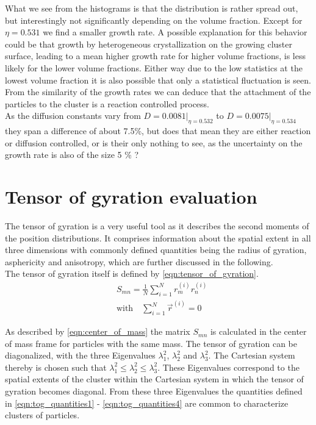 What we see from the histograms is that the distribution is rather spread out, but interestingly not significantly depending on the volume fraction. Except for $\eta = 0.531$ we find a smaller growth rate. A possible explanation for this behavior could be that growth by heterogeneous crystallization on the growing cluster surface, leading to a mean higher growth rate for higher volume fractions, is less likely for the lower volume fractions. Either way due to the low statistics at the lowest volume fraction it is also possible that only a statistical fluctuation is seen. From the similarity of the growth rates we can deduce that the attachment of the particles to the cluster is a reaction controlled process.  \\

As the diffusion constants vary from $D=0.0081|_{\eta = 0.532}$ to $D=0.0075|_{\eta = 0.534}$ they span a difference of about 7.5\%, but does that mean they are either reaction or diffusion controlled, or is their only nothing to see, as the uncertainty on the growth rate is also of the size 5 \% ?

\section{Tensor of gyration evaluation}
\label{sec:tog}
The tensor of gyration is a very useful tool as it describes the second moments of the position distributions. It comprises information about the spatial extent in all three dimensions with commonly  defined quantities being the radius of gyration, asphericity and anisotropy\cite{Theodorou1985}, which are further discussed in the following.\\

The tensor of gyration itself is defined by \autoref{eqn:tensor_of_gyration}.
\begin{align}
\label{eqn:tensor_of_gyration}
&S_{mn}=\frac{1}{N} \sum_{i=1}^{N} r^{(i)}_m r^{(i)}_n\\
\label{eqn:center_of_mass}
&\text{with} \quad \sum_{i=1}^{N} \vec{r}^{(i)} = 0
\end{align}

As described by \autoref{eqn:center_of_mass} the matrix $S_{mn}$ is calculated in the center of mass frame for particles with the same mass. The tensor of gyration can be diagonalized, with the three Eigenvalues $\lambda_1^2$, $\lambda_2^2$ and $\lambda_3^2$. The Cartesian system thereby is chosen such that $\lambda_1^2 \leq \lambda_2^2 \leq \lambda_3^2 $. These Eigenvalues correspond to the spatial extents of the cluster within the Cartesian system in which the tensor of gyration becomes diagonal. From these three Eigenvalues the quantities defined in \autoref{eqn:tog_quantities1} - \ref{eqn:tog_quantities4} are common to characterize clusters of particles.

